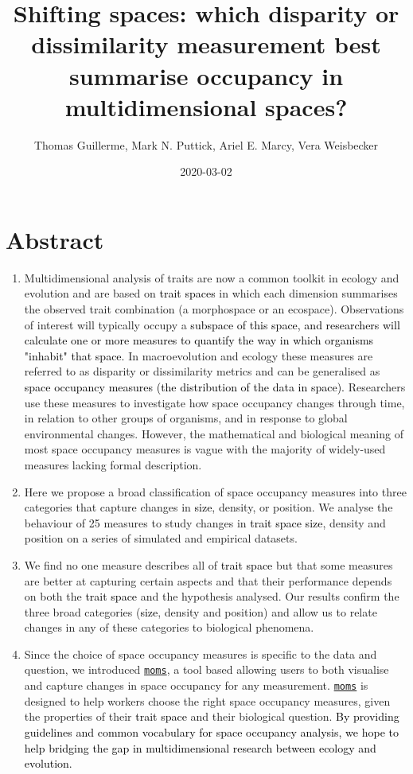 \documentclass[]{article}
\title{Shifting spaces: which disparity or dissimilarity measurement best
summarise occupancy in multidimensional spaces?}
\author{Thomas Guillerme, Mark N. Puttick, Ariel E. Marcy, Vera Weisbecker}
\date{2020-03-02}
\begin{document}
\maketitle
\modulolinenumbers[1] %
\linenumbers
\section{Abstract}\label{abstract}

\begin{enumerate}
\def\labelenumi{\arabic{enumi}.}
\item
  Multidimensional analysis of traits are now a common toolkit in
  ecology and evolution and are based on
  \textcolor{black}{trait spaces} in which each dimension
  summarises the observed trait combination (a morphospace or an
  ecospace). Observations of interest will typically occupy a
  \textcolor{black}{subspace of this space, and researchers will calculate one or more measures to quantify the way in which organisms "inhabit" that space.}
  In macroevolution and ecology these measures are referred to as
  disparity or dissimilarity metrics and can be generalised as
  \textcolor{black}{space occupancy measures (the distribution of the data in space).}
  Researchers use these measures to investigate how space occupancy
  changes through time, in relation to other groups of organisms, and in
  response to global environmental changes. However, the mathematical
  and biological meaning of most space occupancy measures is vague with
  the majority of widely-used measures lacking formal description.
\item
  Here we propose a broad classification of space occupancy measures
  into three categories that capture changes in
  \textcolor{black}{size}, density, or position. We analyse
  the behaviour of 25 measures to study changes in
  \textcolor{black}{trait space size}, density and position
  on a series of simulated and empirical datasets.
\item
  We find no one measure describes all of
  \textcolor{black}{trait space} but that some measures are
  better at capturing certain aspects and that their performance depends
  on both the \textcolor{black}{trait space} and the
  hypothesis analysed. Our results confirm the three broad categories
  (\textcolor{black}{size}, density and position) and allow
  us to relate changes in any of these categories to biological
  phenomena.
\item
  Since the choice of space occupancy measures is specific to the data
  and question, we introduced
  \href{https://tguillerme.shinyapps.io/moms/}{\texttt{moms}}, a tool
  based allowing users to both visualise and capture changes in space
  occupancy for any measurement.
  \href{https://tguillerme.shinyapps.io/moms/}{\texttt{moms}} is
  designed to help workers choose the right space occupancy measures,
  given the properties of their
  \textcolor{black}{trait space} and their biological
  question.
  \textcolor{black}{By providing guidelines and common vocabulary for space occupancy analysis, we hope to help bridging the gap in multidimensional research between ecology and evolution.}
\end{enumerate}
\end{document}
